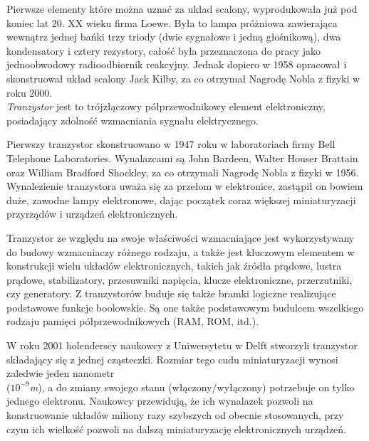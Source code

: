 \documentclass[openany,a4paper,11pt]{article}
\begin{document}
 Pierwsze elementy które można uznać za układ scalony, wyprodukowała już pod koniec lat 20. XX wieku firma Loewe. Była to lampa próżniowa zawierająca wewnątrz jednej bańki trzy \newline   triody (dwie sygnałowe i jedną głośnikową), dwa kondensatory i cztery rezystory, całość była przeznaczona do pracy jako jednoobwodowy radioodbiornik reakcyjny. Jednak dopiero w 1958 opracował i skonstruował układ scalony Jack Kilby, za co otrzymał Nagrodę Nobla z fizyki w roku 2000.
\\[2 ex]
\indent \emph {Tranzystor } jest to trójzłączowy półprzewodnikowy element elektroniczny, posiadający zdolność wzmacniania sygnału elektrycznego. 

 Pierwszy tranzystor skonstruowano w 1947 roku w laboratoriach firmy Bell Telephone Laboratories. Wynalazcami są John Bardeen, Walter Houser Brattain oraz William Bradford Shockley, za co otrzymali Nagrodę Nobla z fizyki w 1956. Wynalezienie tranzystora uważa się za przełom w elektronice, zastąpił on bowiem duże, zawodne lampy elektronowe, dając początek coraz większej miniaturyzacji przyrządów i urządzeń elektronicznych.

 Tranzystor ze względu na swoje właściwości wzmacniające jest  wykorzystywany do budowy wzmacniaczy różnego rodzaju, a także jest kluczowym elementem w konstrukcji wielu układów elektronicznych, takich jak źródła prądowe, lustra prądowe, stabilizatory, przesuwniki napięcia, klucze elektroniczne, przerzutniki, czy generatory. Z tranzystorów buduje się także bramki logiczne realizujące podstawowe funkcje boolowskie. Są one także podstawowym budulcem wszelkiego rodzaju pamięci półprzewodnikowych (RAM, ROM, itd.). 

W roku 2001 holenderscy naukowcy z Uniwersytetu w Delft stworzyli tranzystor składający się z jednej cząsteczki. Rozmiar tego cudu miniaturyzacji wynosi zaledwie jeden nanometr \\ ($10^{-9}$\emph{m}), a do zmiany swojego stanu (włączony/wyłączony) potrzebuje on tylko jednego elektronu. Naukowcy przewidują, że ich wynalazek pozwoli na konstruowanie układów miliony razy szybszych od obecnie stosowanych, przy czym ich wielkość pozwoli na dalszą miniaturyzację elektronicznych urządzeń. 
\end{document}
